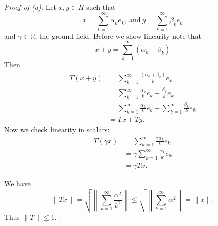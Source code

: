 \begin{proof}[Proof of (a)]
    Let $x,y\in H$ such that 
    \[
        x = \sum_{k=1}^\infty \alpha_k e_k, \ \text{and} \ 
        y = \sum_{k=1}^\infty \beta_k e_k 
    \]
    and $\gamma \in \mathbb R$, the ground-field. Before 
    we show linearity note that 
    \[
        x + y = \sum_{k=1}^\infty (\alpha_k + \beta_k) 
    \]
    Then 
    \begin{align*}
        T(x+y) 
        &= \sum_{k=1}^\infty \frac{(\alpha_k + \beta_k)}{k} e_k \\ 
        &= \sum_{k=1}^\infty \frac{\alpha_k}{k} e_k + 
        \frac{\beta_k}{k} e_k \\ 
        &= \sum_{k=1}^\infty \frac{\alpha_k}{k} e_k + 
        \sum_{k=1}^\infty 
        \frac{\beta_k}{k} e_k \\ 
        &= Tx + Ty. 
    \end{align*}
    Now we check linearity in scalars: 
    \begin{align*}
        T(\gamma x) 
        &= \sum_{k=1}^\infty \frac{\gamma \alpha_k}{k} e_k \\ 
        &= \gamma \sum_{k=1}^\infty \frac{\alpha_k}{k} e_k \\ 
        &= \gamma Tx.
    \end{align*}

    We have 
    \[
        \|Tx\| = \sqrt{\left\|\sum_{k=1}^\infty 
        \frac{\alpha^2}{k^2} \right\|}
        \leq 
        \sqrt{\left\|\sum_{k=1}^\infty 
        \alpha^2 \right\|} = \|x\|. 
    \]
    Thus $\|T\| \leq 1$.
\end{proof}
